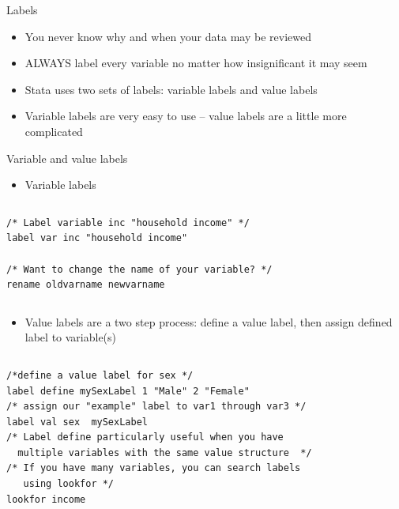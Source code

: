 \documentclass[table,smaller]{beamer}
\begin{document}
\begin{frame}[label=sec-4-1]{Labels}
\begin{itemize}
\item You never know why and when your data may be reviewed
\item ALWAYS label every variable no matter how insignificant it may seem
\item Stata uses two sets of labels: \alert{variable labels} and \alert{value labels}
\item Variable labels are very easy to use -- value labels are a little more complicated
\end{itemize}
\end{frame}
\begin{frame}[fragile,label=sec-4-2]{Variable and value labels}
 \begin{itemize}
\item Variable labels
\end{itemize}
\vspace{-.5em} \begin{columns}  \begin{block}{}
\begin{verbatim}
/* Label variable inc "household income" */
label var inc "household income"

/* Want to change the name of your variable? */
rename oldvarname newvarname
\end{verbatim}
\end{block} \end{columns}

\begin{itemize}
\item Value labels are a two step process: define a value label, then assign defined label to variable(s)
\end{itemize}

\vspace{-.5em} \begin{columns}  \begin{block}{}
\begin{verbatim}
/*define a value label for sex */
label define mySexLabel 1 "Male" 2 "Female"
/* assign our "example" label to var1 through var3 */
label val sex  mySexLabel
/* Label define particularly useful when you have
  multiple variables with the same value structure  */
/* If you have many variables, you can search labels 
   using lookfor */
lookfor income
\end{verbatim}
\end{block} \end{columns}
\end{frame}
\end{document}
